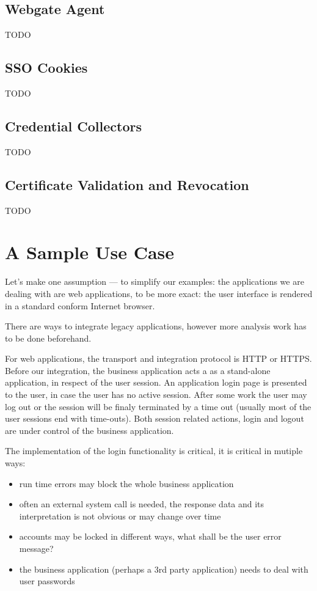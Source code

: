 \subsection{Webgate Agent}

TODO


\subsection{SSO Cookies}

TODO


\subsection{Credential Collectors}

TODO


\subsection{Certificate Validation and Revocation}

TODO


\section{A Sample Use Case}

Let's make one assumption --- to simplify our examples: the applications
we are dealing with are web applications, to be more exact: the user
interface is rendered in a standard conform Internet browser.

There are ways to integrate legacy applications, however more analysis
work has to be done beforehand.

For web applications, the transport and integration protocol is HTTP or
HTTPS\@. Before our integration, the business application acts a as a
stand-alone application, in respect of the user session. An application
login page is presented to the user, in case the user has no active
session. After some work the user may log out or the session will be
finaly terminated by a time out (usually most of the user sessions end
with time-outs). Both session related actions, login and logout are
under control of the business application.

The implementation of the login functionality is critical, it is
critical in mutiple ways:

\begin{itemize}
    \item run time errors may block the whole business application
    \item often an external system call is needed, the response data 
        and its interpretation is not obvious or may change over time
    \item accounts may be locked in different ways, what shall be the 
        user error message?
    \item the business application (perhaps a 3rd party application) 
        needs to deal with user passwords
\end{itemize}

